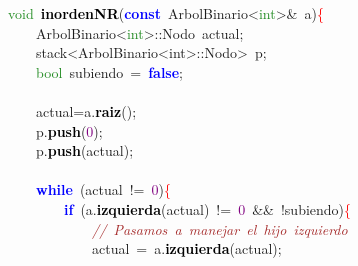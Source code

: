 \noindent
\mbox{}\textcolor{ForestGreen}{void}\ \textbf{\textcolor{Black}{inordenNR}}\textcolor{BrickRed}{(}\textbf{\textcolor{Blue}{const}}\ ArbolBinario\textcolor{BrickRed}{\textless{}}\textcolor{ForestGreen}{int}\textcolor{BrickRed}{\textgreater{}\&}\ a\textcolor{BrickRed}{)}\textcolor{Red}{\{} \\
\mbox{}\ \ \ \ ArbolBinario\textcolor{BrickRed}{\textless{}}\textcolor{ForestGreen}{int}\textcolor{BrickRed}{\textgreater{}::}\textcolor{TealBlue}{Nodo}\ actual\textcolor{BrickRed}{;} \\
\mbox{}\ \ \ \ \textcolor{TealBlue}{stack\textless{}ArbolBinario\textless{}int\textgreater{}::Nodo\textgreater{}}\ p\textcolor{BrickRed}{;} \\
\mbox{}\ \ \ \ \textcolor{ForestGreen}{bool}\ subiendo\ \textcolor{BrickRed}{=}\ \textbf{\textcolor{Blue}{false}}\textcolor{BrickRed}{;}\ \ \ \  \\
\mbox{} \\
\mbox{}\ \ \ \ actual\textcolor{BrickRed}{=}a\textcolor{BrickRed}{.}\textbf{\textcolor{Black}{raiz}}\textcolor{BrickRed}{();} \\
\mbox{}\ \ \ \ p\textcolor{BrickRed}{.}\textbf{\textcolor{Black}{push}}\textcolor{BrickRed}{(}\textcolor{Purple}{0}\textcolor{BrickRed}{);} \\
\mbox{}\ \ \ \ p\textcolor{BrickRed}{.}\textbf{\textcolor{Black}{push}}\textcolor{BrickRed}{(}actual\textcolor{BrickRed}{);} \\
\mbox{}\ \ \ \  \\
\mbox{}\ \ \ \ \textbf{\textcolor{Blue}{while}}\ \textcolor{BrickRed}{(}actual\ \textcolor{BrickRed}{!=}\ \textcolor{Purple}{0}\textcolor{BrickRed}{)}\textcolor{Red}{\{} \\
\mbox{}\ \ \ \ \ \ \ \ \textbf{\textcolor{Blue}{if}}\ \textcolor{BrickRed}{(}a\textcolor{BrickRed}{.}\textbf{\textcolor{Black}{izquierda}}\textcolor{BrickRed}{(}actual\textcolor{BrickRed}{)}\ \textcolor{BrickRed}{!=}\ \textcolor{Purple}{0}\ \textcolor{BrickRed}{\&\&}\ \textcolor{BrickRed}{!}subiendo\textcolor{BrickRed}{)}\textcolor{Red}{\{} \\
\mbox{}\ \ \ \ \ \ \ \ \ \ \ \ \textit{\textcolor{Brown}{//\ Pasamos\ a\ manejar\ el\ hijo\ izquierdo}} \\
\mbox{}\ \ \ \ \ \ \ \ \ \ \ \ actual\ \textcolor{BrickRed}{=}\ a\textcolor{BrickRed}{.}\textbf{\textcolor{Black}{izquierda}}\textcolor{BrickRed}{(}actual\textcolor{BrickRed}{);} \\
